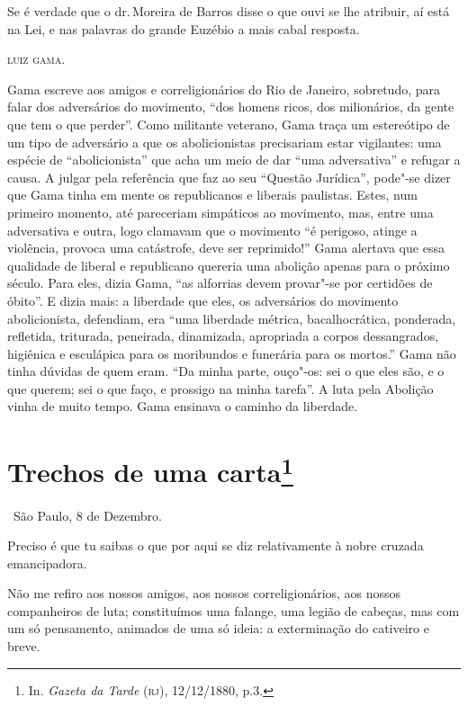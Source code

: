 Se é verdade que o dr.\,Moreira de Barros disse o que ouvi se lhe
atribuir, aí está na Lei, e nas palavras do grande Euzébio a mais cabal
resposta.

\bigskip

\hfill\textsc{luiz gama.}

\paginabranca
\mbox{}\vfill
\thispagestyle{empty}

{\small\noindent
Gama escreve aos amigos e correligionários do Rio de Janeiro,
sobretudo, para falar dos adversários do movimento, ``dos homens ricos,
dos milionários, da gente que tem o que perder''. Como militante
veterano, Gama traça um estereótipo de um tipo de adversário a que os
abolicionistas precisariam estar vigilantes: uma espécie de
``abolicionista'' que acha um meio de dar ``uma adversativa'' e refugar a
causa. A julgar pela referência que faz ao seu ``Questão Jurídica'',
pode"-se dizer que Gama tinha em mente os republicanos e liberais
paulistas. Estes, num primeiro momento, até pareceriam simpáticos ao
movimento, mas, entre uma adversativa
e outra, logo clamavam que o movimento ``é perigoso, atinge a violência,
provoca uma catástrofe, deve ser reprimido!'' Gama alertava que essa
qualidade de liberal e republicano quereria uma abolição apenas para o
próximo século. Para eles, dizia Gama, ``as alforrias devem provar"-se por
certidões de óbito''. E dizia mais: a liberdade que eles, os adversários
do movimento abolicionista, defendiam, era ``uma liberdade métrica,
bacalhocrática, ponderada, refletida, triturada, peneirada, dinamizada,
apropriada a corpos dessangrados, higiênica e esculápica para os
moribundos e funerária para os mortos.'' Gama não tinha dúvidas de quem
eram. ``Da minha parte, ouço"-os: sei o que eles são, e o que querem; sei
o que faço, e prossigo na minha tarefa''. A luta pela Abolição vinha de
muito tempo. Gama ensinava o caminho da liberdade. }

\chapter{Trechos de uma carta\footnote[*]{In. \emph{Gazeta da Tarde}
  (\textsc{rj}), 12/12/1880, p.3.}}

\hfill\ São Paulo, 8 de Dezembro.\medskip

\noindent{}Preciso é que tu saibas o que por aqui se diz relativamente à nobre
cruzada emancipadora.

Não me refiro aos nossos amigos, aos nossos correligionários, aos nossos
companheiros de luta; constituímos uma falange, uma legião de cabeças,
mas com um só pensamento, animados de uma só ideia: a exterminação do
cativeiro e breve.

